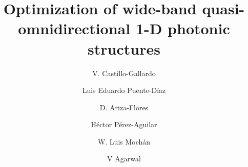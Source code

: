 \documentclass[a4paper,fleqn]{cas-sc}
\begin{document}
	\let\WriteBookmarks\relax
	\def\floatpagepagefraction{1}
	\def\textpagefraction{.001}
	
	\title [mode = title]{Optimization of wide-band quasi-omnidirectional 1-D photonic structures}                      
	
	\author[1,2,3]{V. Castillo-Gallardo}
	\cormark[1]
	\address[1]{Centro de Investigaci\'{o}n en Ingenier\'{i}a y
		Ciencias Aplicadas, Universidad del Estado de Morelos, Av.
		Universidad 1001, Col. Chamilpa, Cuernavaca, Morelos 62209,
		M\'{e}xico.}
	
	\author[1,2,3]{Luis Eduardo Puente-D\'{i}az}
	\address[2]{Instituto de Ciencias F\'{i}sicas, Universidad
		Nacional Aut\'{o}noma de M\'{e}xico, Av. Universidad S/N,
		Col. Chamilpa, 62210 Cuernavaca, Morelos, M\'{e}xico.}
	\address[3]{Facultad de Ciencias F\'{i}sico Matem\'{a}ticas,
		Universidad Michoacana de San Nicol\'{a}s de Hidalgo, Av.
		Francisco J. Múgica S/N 58030, Morelia, Mich., M\'{e}xico.}
	
	\author[4]{D. Ariza-Flores}
	\address[4]{CONACyT-Universidad Aut\'{o}noma de San Luis
		Potos\'{i}, Karakorum 1470, Lomas 4ta Secc, San Luis Potos\'{i},
		S.L.P., 78210, M\'{e}xico.}
	
	\author[3]{H\'{e}ctor P\'{e}rez-Aguilar}
	
	\author[2]{W. Luis Moch\'{a}n}
	
	\author[1]{V Agarwal}
	\cormark[2]
	\fnmark[1]
	
	
\end{document}
